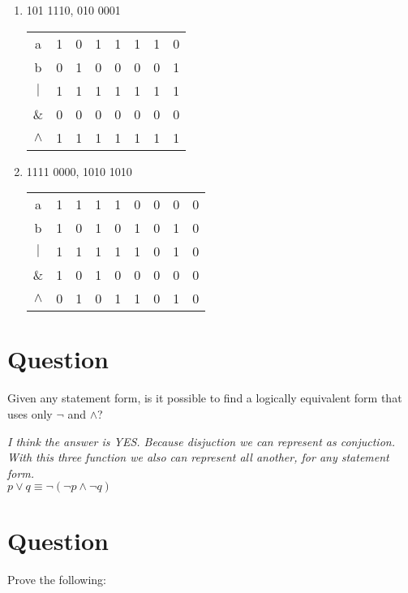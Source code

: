 \documentclass[a4paper,11pt]{article}
\begin{document}
\begin{enumerate}[label=\alph*)]
  \item
  101 1110, 010 0001

  \begin{tabular}{|c|ccccccc|}
    \hline
    a       & 1 & 0 & 1 & 1 & 1 & 1 & 0\\
    b       & 0 & 1 & 0 & 0 & 0 & 0 & 1\\
    \hline
    $|$     & 1 & 1 & 1 & 1 & 1 & 1 & 1\\
    \&      & 0 & 0 & 0 & 0 & 0 & 0 & 0\\
    $\wedge$& 1 & 1 & 1 & 1 & 1 & 1 & 1\\
    \hline
  \end{tabular}
  \item
  1111 0000, 1010 1010

  \begin{tabular}{|c|cccccccc|}
    \hline
    a       & 1 & 1 & 1 & 1 & 0 & 0 & 0 & 0\\
    b       & 1 & 0 & 1 & 0 & 1 & 0 & 1 & 0\\
    \hline
    $|$     & 1 & 1 & 1 & 1 & 1 & 0 & 1 & 0\\
    \&      & 1 & 0 & 1 & 0 & 0 & 0 & 0 & 0\\
    $\wedge$& 0 & 1 & 0 & 1 & 1 & 0 & 1 & 0\\
    \hline
  \end{tabular}
\end{enumerate}

\section{Question}
\label{sec:Question}
Given any statement form, is it possible to find a logically equivalent form that uses only $\neg$ and $\wedge$?

\emph{I think the answer is YES. Because disjuction we can represent as conjuction. With this three function we also can represent all another, for any statement form.}\\

$p \vee q \equiv \neg (\neg p \wedge \neg q)$

\section{Question}
\label{sec:Question}
Prove the following:
\end{document}
